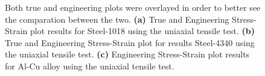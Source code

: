 \documentclass{article}
\begin{document}
\begin{description}[style = nextline]
\begin{figure}[H]
\centering
{}
\caption{Both true and engineering plots were overlayed in order to better see the comparation between the two. \textbf{(a)} True and Engineering Stress-Strain plot results for Steel-1018 using the uniaxial tensile test. \textbf{(b)} True and Engineering Stress-Strain plot for results Steel-4340 using the uniaxial tensile test. \textbf{(c)} Engineering Stress-Strain plot results for Al-Cu alloy using the uniaxial tensile test.}
\end{figure}


\end{description}
\end{document}

